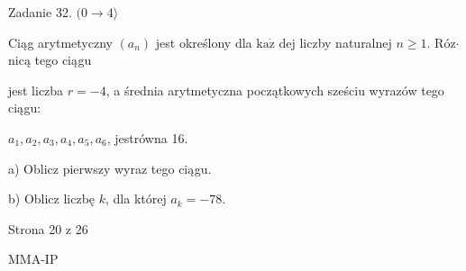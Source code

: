 \documentclass[a4paper,12pt]{article}
\begin{document}
Zadanie 32. $(0\rightarrow 4\rangle$

Ciąg arytmetyczny $(a_{n})$ jest określony dla $\mathrm{k}\mathrm{a}\dot{\mathrm{z}}$ dej liczby naturalnej $n\geq 1$. Róz$\cdot$nicą tego ciągu

jest liczba $r=-4$, a średnia arytmetyczna początkowych sześciu wyrazów tego ciągu:

$a_{1}, a_{2}, a_{3}, a_{4}, a_{5}, a_{6}$, jestrówna 16.

a) Oblicz pierwszy wyraz tego ciągu.

b) Oblicz liczbę $k$, dla której $a_{k}=-78.$

Strona 20 z 26

MMA-IP
\end{document}
